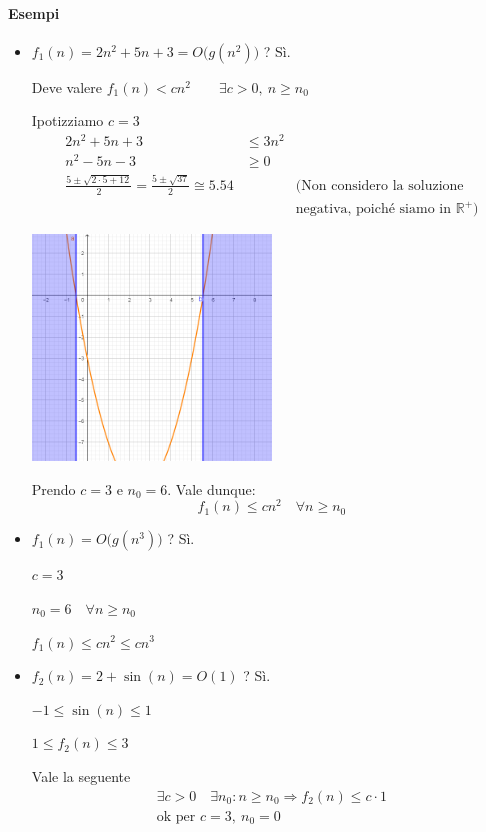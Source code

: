 \paragraph{Esempi}
\begin{itemize}
	\item $f_1(n) = 2n^2 + 5n + 3 = O \big(g(n^2) \big)$ ? Sì. \par
	Deve valere $f_1(n) < cn^2 \qquad \exists c > 0, \ n \geq n_0$ \par
	Ipotizziamo $c = 3$
	\begin{align*}
		2n^2 + 5n + 3 & \leq 3n^2 \\
		n^2 - 5n - 3 & \geq 0 \\
		\frac{5 \pm \sqrt{2 \cdot 5 + 12}}{2} = \frac{5 \pm \sqrt{37}}{2} \cong 5.54 && \text{(Non considero la soluzione} \\ && \text{negativa, poiché siamo in } \mathbb{R}^+ \text{)}
	\end{align*}
	\begin{center}
		\includegraphics[height=6cm]{img/parabola-plot1.png}
	\end{center}
	
	Prendo $c = 3$ e $n_0 = 6$. Vale dunque:
	\begin{displaymath}
		f_1(n) \leq cn^2 \quad \forall n \geq n_0
	\end{displaymath}

	\item $f_1(n) = O \big(g(n^3) \big)$ ? Sì. \par
	$c = 3 $\par
	$n_0 = 6 \quad \forall n \geq n_0$ \par
	$f_1(n) \leq cn^2 \leq cn^3$
	
	\item $f_2(n) = 2 + \sin (n) = O(1)$ ? Sì. \par
	$-1 \leq \sin (n) \leq 1$ \par
	$1 \leq f_2(n) \leq 3$ \par
	Vale la seguente
	\begin{gather*}
		\exists c > 0 \quad \exists n_0 : n \geq n_0 \Rightarrow f_2(n) \leq c \cdot 1 \\
		\text{ok per } c = 3, \ n_0 = 0
	\end{gather*}
\end{itemize}
\newpage
